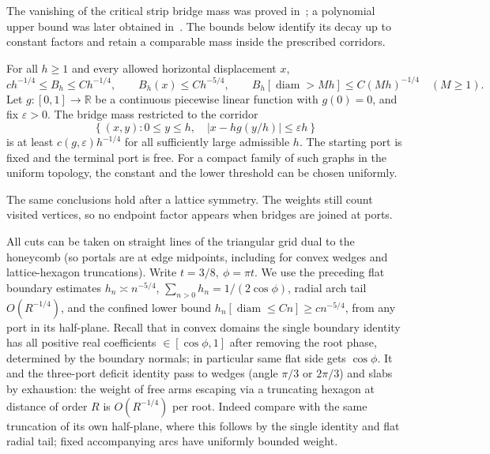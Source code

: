 The vanishing of the critical strip bridge mass was proved
in~\cite{BeatonEtAl2014}; a polynomial upper bound was later obtained
in~\cite{KrachunPanagiotis2026}. The bounds below identify its decay
up to constant factors and retain a comparable mass inside the
prescribed corridors.

\begin{theorem}\label{a:bridge-spatial}\label{thm:slab-corridors}
For all $h\ge1$ and every allowed horizontal displacement $x$,
\begin{equation}\label{a:bridge-estimates}
 c h^{-1/4}\le B_h\le C h^{-1/4},\qquad
 B_h(x)\le C h^{-5/4},\qquad
 B_h[\operatorname{diam}>Mh]\le C(Mh)^{-1/4}\quad(M\ge1).
\end{equation}
Let $g:[0,1]\to\mathbb R$ be a continuous piecewise linear function with
$g(0)=0$, and fix $\varepsilon>0$. The bridge mass restricted to the
corridor
\[
 \left\{(x,y):0\le y\le h,\quad
                  |x-hg(y/h)|\le\varepsilon h\right\}
\]
is at least $c(g,\varepsilon)h^{-1/4}$ for all sufficiently large
admissible $h$. The starting port is fixed and the terminal port is free.
For a compact family of such graphs in the uniform topology, the constant
and the lower threshold can be chosen uniformly.
\end{theorem}
The same conclusions hold after a lattice symmetry. The weights still
count visited vertices, so no endpoint factor appears when bridges are
joined at ports.

All cuts can be taken on straight lines of the triangular grid dual to the honeycomb (so portals are at edge midpoints, including for convex wedges and lattice-hexagon truncations). Write \(t=3/8,\ \phi=\pi t\). We use the preceding flat boundary estimates \(h_n\asymp n^{-5/4}\), \(\sum_{n>0}h_n=1/(2\cos\phi)\), radial arch tail \(O(R^{-1/4})\), and the confined lower bound \(h_n[\operatorname{diam}\le C n]\ge c n^{-5/4}\), from any port in its half-plane. Recall that in convex domains the single boundary identity has all positive real coefficients \(\in[\cos\phi,1]\) after removing the root phase, determined by the boundary normals; in particular same flat side gets \(\cos\phi\). It and the three-port deficit identity pass to wedges (angle \(\pi/3\) or \(2\pi/3\)) and slabs by exhaustion: the weight of free arms escaping via a truncating hexagon at distance of order \(R\) is \(O(R^{-1/4})\) per root. Indeed compare with the same truncation of its own half-plane, where this follows by the single identity and flat radial tail; fixed accompanying arcs have uniformly bounded weight.

